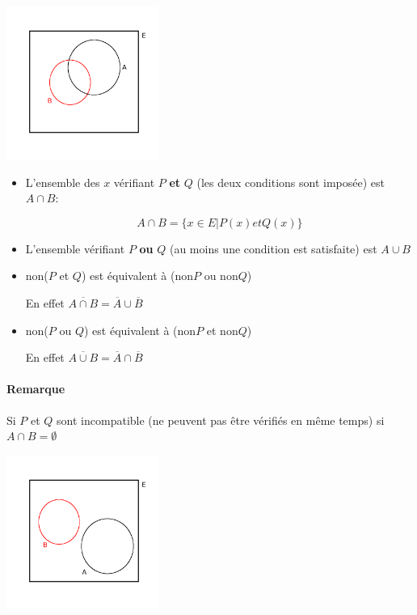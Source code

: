 \documentclass[
    11pt,
    a4paper,
    oneside,
    headinlcude, footinclude,
    twoside,
]{report}
\renewcommand{\bar}[1]{\overline{#1}}
\begin{document}
\begin{center}
    \includegraphics[width=5cm]{fig3}
\end{center}

\begin{itemize}
    \item L'ensemble des $x$ vérifiant $P$ \textbf{et} $Q$ (les deux
        conditions sont imposée) est $A \cap B$:

        $$A \cap B = \{x \in E | P(x) et Q(x)\}$$

    \item L'ensemble vérifiant $P$ \textbf{ou} $Q$ (au moins une condition est
        satisfaite) est $A \cup B$

    \item non($P$ et $Q$) est équivalent à (non$P$ ou non$Q$)

        En effet $\overline{A \cap B} = \bar A \cup \bar B$

    \item non($P$ ou $Q$) est équivalent à (non$P$ et non$Q$)

        En effet $\overline{A \cup B} = \bar A \cap \bar B$
\end{itemize}


\paragraph{Remarque}
\label{par:remarque}

Si $P$ et $Q$ sont incompatible (ne peuvent pas être vérifiés en même temps)
si $A \cap B = \emptyset$

\begin{center}
    \includegraphics[width=5cm]{fig4}
\end{center}
\end{document}
